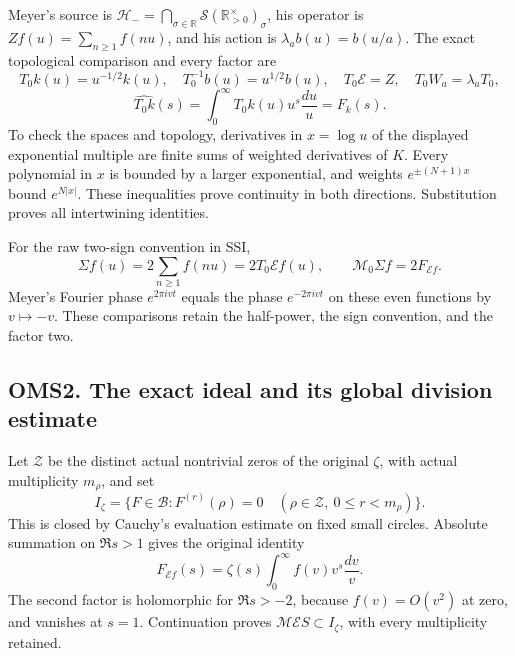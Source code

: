 Meyer's source is
\(\mathcal H_-=\bigcap_{\sigma\in\mathbb R}\mathcal S(\mathbb R_{>0}^{\times})_\sigma\),
his operator is \(Zf(u)=\sum_{n\ge1}f(nu)\), and his action is
\(\lambda_a b(u)=b(u/a)\). The exact topological comparison and every
factor are \[
T_0k(u)=u^{-1/2}k(u),\quad T_0^{-1}b(u)=u^{1/2}b(u),
\quad T_0\mathcal E=Z,\quad T_0W_a=\lambda_aT_0,
\] \[
\widehat{T_0k}(s)=\int_0^\infty T_0k(u)u^s\frac{du}{u}=F_k(s).
\tag{OMS1.4}
\] To check the spaces and topology, derivatives in \(x=\log u\) of the
displayed exponential multiple are finite sums of weighted derivatives
of \(K\). Every polynomial in \(x\) is bounded by a larger exponential,
and weights \(e^{\pm(N+1)x}\) bound \(e^{N|x|}\). These inequalities
prove continuity in both directions. Substitution proves all
intertwining identities.

For the raw two-sign convention in SSI, \[
\Sigma f(u)=2\sum_{n\ge1}f(nu)=2T_0\mathcal Ef(u),\qquad
\mathcal M_0\Sigma f=2F_{\mathcal Ef}.
\tag{OMS1.5}
\] Meyer's Fourier phase \(e^{2\pi ivt}\) equals the phase
\(e^{-2\pi ivt}\) on these even functions by \(v\mapsto-v\). These
comparisons retain the half-power, the sign convention, and the factor
two.

\subsection{OMS2. The exact ideal and its global division
estimate}\label{oms2.-the-exact-ideal-and-its-global-division-estimate}

Let \(\mathcal Z\) be the distinct actual nontrivial zeros of the
original \(\zeta\), with actual multiplicity \(m_\rho\), and set \[
I_\zeta=\{F\in\mathcal B:F^{(r)}(\rho)=0
\quad(\rho\in\mathcal Z,\ 0\le r<m_\rho)\}.
\tag{OMS2.1}
\] This is closed by Cauchy's evaluation estimate on fixed small
circles. Absolute summation on \(\Re s>1\) gives the original identity
\[
F_{\mathcal Ef}(s)=\zeta(s)\int_0^\infty f(v)v^s\frac{dv}{v}.
\tag{OMS2.2}
\] The second factor is holomorphic for \(\Re s>-2\), because
\(f(v)=O(v^2)\) at zero, and vanishes at \(s=1\). Continuation proves
\(\mathcal M\mathcal ES\subset I_\zeta\), with every multiplicity
retained.

